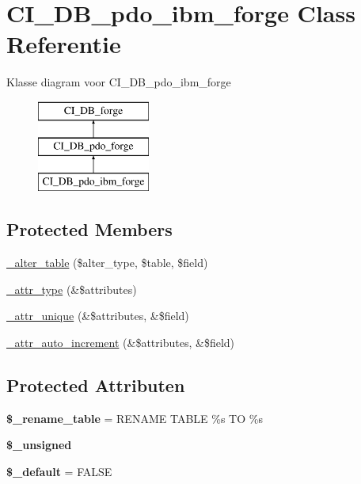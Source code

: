 \hypertarget{class_c_i___d_b__pdo__ibm__forge}{}\section{C\+I\+\_\+\+D\+B\+\_\+pdo\+\_\+ibm\+\_\+forge Class Referentie}
\label{class_c_i___d_b__pdo__ibm__forge}
Klasse diagram voor C\+I\+\_\+\+D\+B\+\_\+pdo\+\_\+ibm\+\_\+forge\begin{figure}[H]
\begin{center}
\leavevmode
\includegraphics[height=3.000000cm]{class_c_i___d_b__pdo__ibm__forge}
\end{center}
\end{figure}
\subsection*{Protected Members}
\begin{DoxyCompactItemize}
\item 
\mbox{\hyperlink{class_c_i___d_b__pdo__ibm__forge_a41c6cae02f2fda8b429ad0afb9509426}{\+\_\+alter\+\_\+table}} (\$alter\+\_\+type, \$table, \$field)
\item 
\mbox{\hyperlink{class_c_i___d_b__pdo__ibm__forge_a8553be952084c6f7cdfff370a1d14f6b}{\+\_\+attr\+\_\+type}} (\&\$attributes)
\item 
\mbox{\hyperlink{class_c_i___d_b__pdo__ibm__forge_a7568a93ea53a7392a63fffe83bb7a090}{\+\_\+attr\+\_\+unique}} (\&\$attributes, \&\$field)
\item 
\mbox{\hyperlink{class_c_i___d_b__pdo__ibm__forge_a2a013a5932439c3c44f0dad3436525f7}{\+\_\+attr\+\_\+auto\+\_\+increment}} (\&\$attributes, \&\$field)
\end{DoxyCompactItemize}
\subsection*{Protected Attributen}
\begin{DoxyCompactItemize}
\item 
\mbox{\label{class_c_i___d_b__pdo__ibm__forge_a1a649e7cf9de16bcf932977b18bc91de}} 
{\bfseries \$\+\_\+rename\+\_\+table} = \textquotesingle{}R\+E\+N\+A\+ME T\+A\+B\+LE \%s TO \%s\textquotesingle{}
\item 
{\bfseries \$\+\_\+unsigned}
\item 
\mbox{\label{class_c_i___d_b__pdo__ibm__forge_aa119e1b4e3d00f47a7b83b7066087915}} 
{\bfseries \$\+\_\+default} = F\+A\+L\+SE
\end{DoxyCompactItemize}
